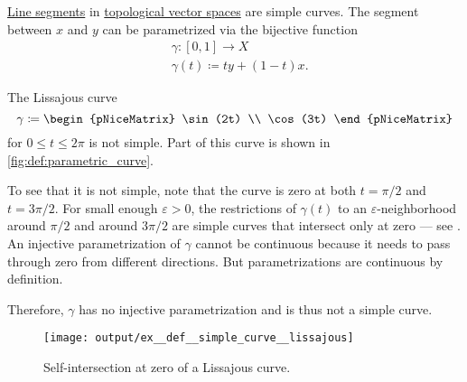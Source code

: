 \begin{example}\label{ex:def:simple_curve}
  \hfill
  \begin{thmenum}
     \hyperref[def:line_segment]{Line segments} in \hyperref[def:topological_vector_space]{topological vector spaces} are simple curves. The segment between \( x \) and \( y \) can be parametrized via the bijective function
    \begin{equation*}
      \begin{aligned}
        &\gamma: [0, 1] \to X \\
        &\gamma(t) \coloneqq ty + (1 - t)x.
      \end{aligned}
    \end{equation*}

     The Lissajous curve
    \begin{equation*}
      \gamma \coloneqq \begin{pNiceMatrix} \sin(2t) \\ \cos(3t) \end{pNiceMatrix}
    \end{equation*}
    for \( 0 \leq t \leq 2\pi \) is not simple. Part of this curve is shown in \cref{fig:def:parametric_curve}.

    To see that it is not simple, note that the curve is zero at both \( t = \pi / 2 \) and \( t = 3\pi / 2 \). For small enough \( \varepsilon > 0 \), the restrictions of \( \gamma(t) \) to an \( \varepsilon \)-neighborhood around \( \pi / 2 \) and around \( 3\pi / 2 \) are simple curves that intersect only at zero --- see . An injective parametrization of \( \gamma \) cannot be continuous because it needs to pass through zero from different directions. But parametrizations are continuous by definition.

    Therefore, \( \gamma \) has no injective parametrization and is thus not a simple curve.

    \begin{figure}[!ht]
      \centering
      \texttt{[image: output/ex\_\_def\_\_simple\_curve\_\_lissajous]}
      \caption{Self-intersection at zero of a Lissajous curve.}\label{fig:ex:def:simple_curve/lissajous}
    \end{figure}
  \end{thmenum}
\end{example}

